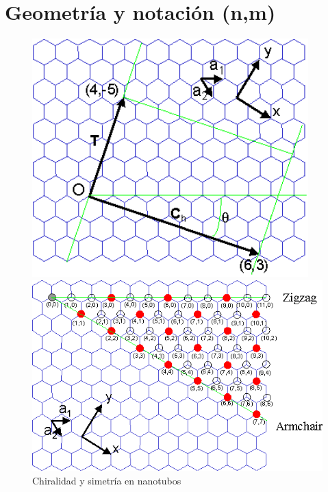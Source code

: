 \section{Geometría y notación (n,m)}

\begin{figure}[!h] 
    \centering
    \begin{minipage}{0.45\textwidth}
    \centering
    \includegraphics[width=0.95\textwidth]{ChCNT.png}
    \end{minipage}
    \begin{minipage}{0.45\textwidth}
    \centering
    \includegraphics[width=1.2\textwidth]{NT.png}
    \end{minipage}
    \caption{Chiralidad y simetría en nanotubos \cite{ShigeoChiral}}
\end{figure} \label{fig:GeoVectChir}

